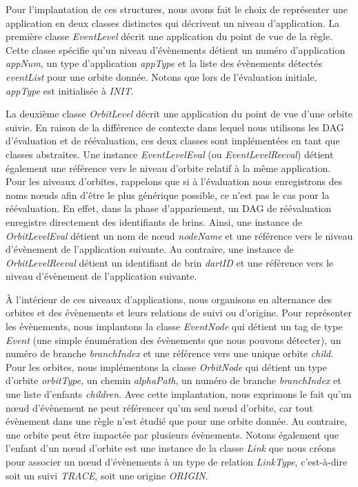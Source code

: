 Pour l'implantation de ces structures, nous avons fait le choix de représenter
une application en deux classes distinctes qui décrivent un niveau
d'application. %
La première classe \textit{EventLevel} décrit une application du point de vue de
la règle. %
Cette classe spécifie qu'un niveau d'évènements détient un numéro d'application
\textit{appNum}, un type d'application \textit{appType} et la liste des
évènements détectés \textit{eventList} pour une orbite donnée. %
Notons que lors de l'évaluation initiale, \textit{appType} est initialisée à
\textit{INIT}. %

La deuxième classe \textit{OrbitLevel} décrit une application du point de vue
d'une orbite suivie. %
En raison de la différence de contexte dans lequel nous utilisons les DAG d'évaluation et de réévaluation, ces deux classes sont implémentées en tant que classes abstraites. %
Une instance \textit{EventLevelEval} (ou \textit{EventLevelReeval}) détient
également une référence vers le niveau d'orbite relatif à la même application. %
Pour les niveaux d'orbites, rappelons que si à l'évaluation nous enregistrons
des noms n\oe uds afin d'être le plus générique possible, ce n'est pas le cas
pour la réévaluation. %
En effet, dans la phase d'appariement, un DAG de réévaluation enregistre
directement des identifiants de brins. %
Ainsi, une instance de \textit{OrbitLevelEval} détient un nom de n\oe ud
\textit{nodeName} et une référence vers le niveau d'évènement de l'application
suivante. %
Au contraire, une instance de \textit{OrbitLevelReeval} détient un identifiant
de brin \textit{dartID} et une référence vers le niveau d'évènement de
l'application suivante. %

À l'intérieur de ces niveaux d'applications, nous organisons en alternance des
orbites et des évènements et leurs relations de suivi ou d'origine. %
Pour représenter les évènements, nous implantons la classe \textit{EventNode}
qui détient un tag de type \textit{Event} (une simple énumération des évènements
que nous pouvons détecter), un numéro de branche \textit{branchIndex} et une
référence vers une unique orbite \textit{child}. %
Pour les orbites, nous implémentons la classe \textit{OrbitNode} qui détient un
type d'orbite \textit{orbitType}, un chemin \textit{alphaPath}, un numéro de
branche \textit{branchIndex} et une liste d'enfants \textit{children}. %
Avec cette implantation, nous exprimons le fait qu'un n\oe ud d'évènement ne
peut référencer qu'un seul n\oe ud d'orbite, car tout évènement dans une règle
n'est étudié que pour une orbite donnée. %
Au contraire, une orbite peut être impactée par plusieurs évènements. %
Notons également que l'enfant d'un n\oe ud d'orbite est une instance de la
classe \textit{Link} que nous créons pour associer un n\oe ud d'évènements à un
type de relation \textit{LinkType}, c'est-à-dire soit un suivi \textit{TRACE},
soit une origine \textit{ORIGIN}. %

